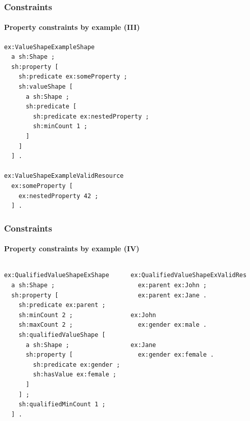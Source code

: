 \documentclass{beamer}
\begin{document}
\begin{frame}[fragile]
  \frametitle{Constraints}
  \framesubtitle{Property constraints by example (III)}

  \begin{Verbatim}[fontsize=\footnotesize]
ex:ValueShapeExampleShape
  a sh:Shape ;
  sh:property [
    sh:predicate ex:someProperty ;
    sh:valueShape [
      a sh:Shape ;
      sh:predicate [
        sh:predicate ex:nestedProperty ;
        sh:minCount 1 ;
      ]
    ]
  ] .

ex:ValueShapeExampleValidResource
  ex:someProperty [
    ex:nestedProperty 42 ;
  ] .
  \end{Verbatim}
\end{frame}

\begin{frame}[fragile]
  \frametitle{Constraints}
  \framesubtitle{Property constraints by example (IV)}

  \begin{columns}[t]

    \begin{Verbatim}[fontsize=\footnotesize]
ex:QualifiedValueShapeExShape
  a sh:Shape ;
  sh:property [
    sh:predicate ex:parent ;
    sh:minCount 2 ;
    sh:maxCount 2 ;
    sh:qualifiedValueShape [
      a sh:Shape ;
      sh:property [
        sh:predicate ex:gender ;
        sh:hasValue ex:female ;
      ]
    ] ;
    sh:qualifiedMinCount 1 ;
  ] .
    \end{Verbatim}


    \begin{Verbatim}[fontsize=\footnotesize]
ex:QualifiedValueShapeExValidRes
  ex:parent ex:John ;
  ex:parent ex:Jane .

ex:John
  ex:gender ex:male .

ex:Jane
  ex:gender ex:female .
    \end{Verbatim}
  \end{columns}
\end{frame}
\end{document}
